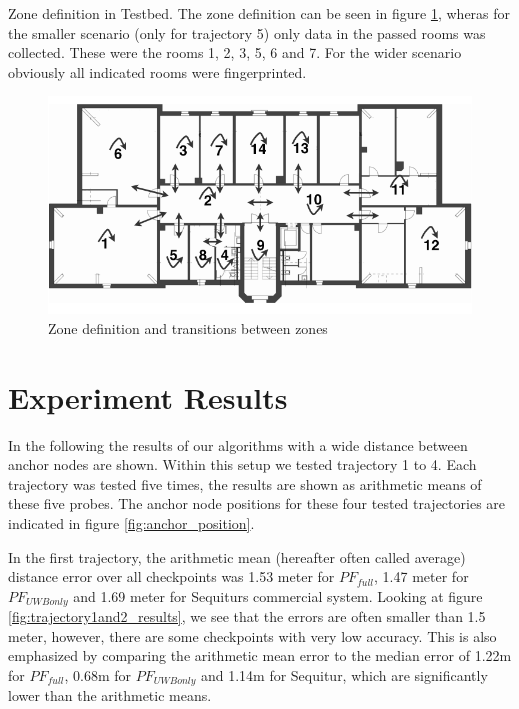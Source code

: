Zone definition in Testbed.
The zone definition can be seen in figure \ref{fig:zone_definition}, wheras for the smaller scenario (only for trajectory 5) only data in the passed rooms was collected. These were the rooms 1, 2, 3, 5, 6 and 7.  For the wider scenario obviously all indicated rooms were fingerprinted.

\begin{figure}[th]
\centering
\includegraphics[width=1.0\textwidth]{Figures/zone_definition}
\decoRule
\caption[Zone definition]{Zone definition and transitions between zones}
\label{fig:zone_definition}
\end{figure}


\section{Experiment Results}
In the following the results of our algorithms with a wide distance between anchor nodes are shown. Within this setup we tested trajectory 1 to 4. Each trajectory was tested five times, the results are shown as arithmetic means of these five probes. The anchor node positions for these four tested trajectories are indicated in figure \ref{fig:anchor_position}.

In the first trajectory, the arithmetic mean (hereafter often called average) distance error over all checkpoints was 1.53 meter for $PF_{full}$, 1.47 meter for $PF_{UWBonly}$ and 1.69 meter for Sequiturs commercial system. Looking at figure \ref{fig:trajectory1and2_results}, we see that the errors are often smaller than 1.5 meter, however, there are some checkpoints with very low accuracy. This is also emphasized by comparing the arithmetic mean error to the median error of 1.22m for $PF_{full}$, 0.68m for $PF_{UWBonly}$ and 1.14m for Sequitur, which are significantly lower than the arithmetic means.

